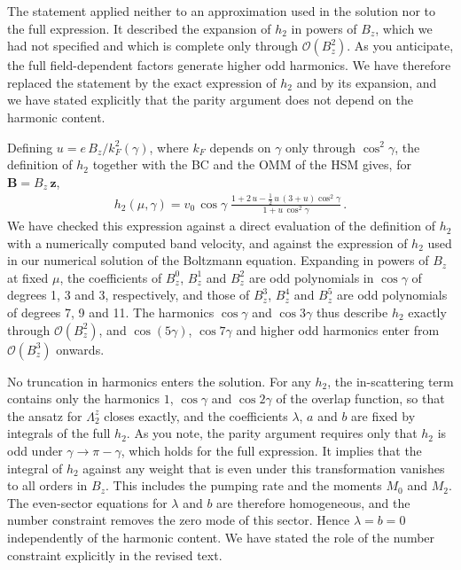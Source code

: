 \documentclass[aps,prb,onecolumn,nofootinbib,citeautoscript,10pt]{revtex4-2}
\DeclareRobustCommand{\bs}[1]{\bm{#1}}
\begin{document}
\begin{enumerate}
The statement applied neither to an approximation used in the solution nor to the full expression. It described the expansion of $h_2$ in powers of $B_z$, which we had not specified and which is complete only through $\mathcal O(B_z^2)$. As you anticipate, the full field-dependent factors generate higher odd harmonics. We have therefore replaced the statement by the exact expression of $h_2$ and by its expansion, and we have stated explicitly that the parity argument does not depend on the harmonic content.

Defining $u=e\,B_z/k_F^2(\gamma)$, where $k_F$ depends on $\gamma$ only through $\cos^2\gamma$, the definition of $h_2$ together with the BC and the OMM of the HSM gives, for $\bs B=B_z\,\hat{\bs z}$,
\begin{align}
h_2(\mu,\gamma)=v_0\,\cos\gamma\;\frac{1+2\,u-\frac{1}{2}\,u\,(3+u)\cos^2\gamma}{1+u\,\cos^2\gamma}\,.
\end{align}
We have checked this expression against a direct evaluation of the definition of $h_2$ with a numerically computed band velocity, and against the expression of $h_2$ used in our numerical solution of the Boltzmann equation. Expanding in powers of $B_z$ at fixed $\mu$, the coefficients of $B_z^0$, $B_z^1$ and $B_z^2$ are odd polynomials in $\cos\gamma$ of degrees 1, 3 and 3, respectively, and those of $B_z^3$, $B_z^4$ and $B_z^5$ are odd polynomials of degrees 7, 9 and 11. The harmonics $\cos\gamma$ and $\cos3\gamma$ thus describe $h_2$ exactly through $\mathcal O(B_z^2)$, and $\cos (5\gamma)$, $\cos7\gamma$ and higher odd harmonics enter from $\mathcal O(B_z^3)$ onwards.

No truncation in harmonics enters the solution. For any $h_2$, the in-scattering term contains only the harmonics $1$, $\cos\gamma$ and $\cos2\gamma$ of the overlap function, so that the ansatz for $\Lambda^z_2$ closes exactly, and the coefficients $\lambda$, $a$ and $b$ are fixed by integrals of the full $h_2$. As you note, the parity argument requires only that $h_2$ is odd under $\gamma\to\pi-\gamma$, which holds for the full expression. It implies that the integral of $h_2$ against any weight that is even under this transformation vanishes to all orders in $B_z$. This includes the pumping rate and the moments $M_0$ and $M_2$. The even-sector equations for $\lambda$ and $b$ are therefore homogeneous, and the number constraint removes the zero mode of this sector. Hence $\lambda=b=0$ independently of the harmonic content. We have stated the role of the number constraint explicitly in the revised text.


\end{enumerate}
\end{document}
